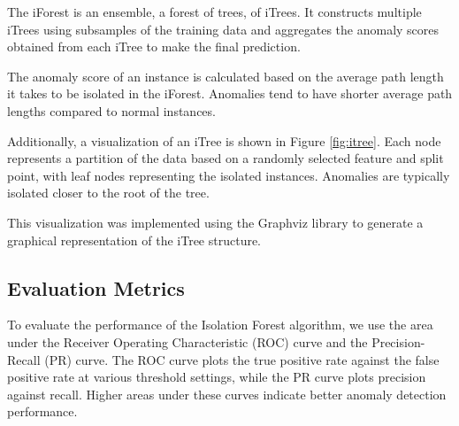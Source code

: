 The iForest is an ensemble, a forest of trees, of iTrees. It constructs multiple iTrees using subsamples of the training data and aggregates the anomaly scores obtained from each iTree to make the final prediction.

The anomaly score of an instance is calculated based on the average path length it takes to be isolated in the iForest. Anomalies tend to have shorter average path lengths compared to normal instances.\par

Additionally, a visualization of an iTree is shown in Figure \ref{fig:itree}. Each node represents a partition of the data based on a randomly selected feature and split point, with leaf nodes representing the isolated instances. Anomalies are typically isolated closer to the root of the tree.\par

This visualization was implemented using the Graphviz library to generate a graphical representation of the iTree structure.


\subsection{Evaluation Metrics}
To evaluate the performance of the Isolation Forest algorithm, we use the area under the Receiver Operating Characteristic (ROC) curve and the Precision-Recall (PR) curve. The ROC curve plots the true positive rate against the false positive rate at various threshold settings, while the PR curve plots precision against recall. Higher areas under these curves indicate better anomaly detection performance.